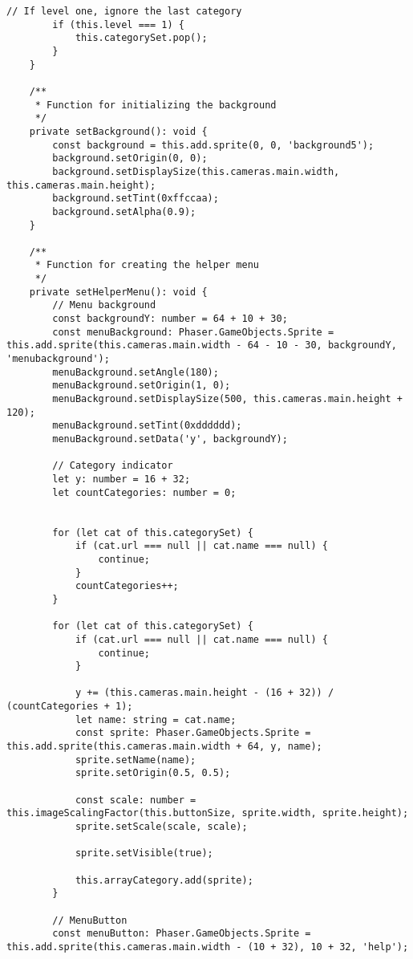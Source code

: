 \begin{lstlisting}[style=TypeScript, caption={gameScene.ts}]
        // If level one, ignore the last category
        if (this.level === 1) {
            this.categorySet.pop();
        }
    }

    /**
     * Function for initializing the background
     */
    private setBackground(): void {
        const background = this.add.sprite(0, 0, 'background5');
        background.setOrigin(0, 0);
        background.setDisplaySize(this.cameras.main.width, this.cameras.main.height);
        background.setTint(0xffccaa);
        background.setAlpha(0.9);
    }

    /**
     * Function for creating the helper menu
     */
    private setHelperMenu(): void {
        // Menu background
        const backgroundY: number = 64 + 10 + 30;
        const menuBackground: Phaser.GameObjects.Sprite = this.add.sprite(this.cameras.main.width - 64 - 10 - 30, backgroundY, 'menubackground');
        menuBackground.setAngle(180);
        menuBackground.setOrigin(1, 0);
        menuBackground.setDisplaySize(500, this.cameras.main.height + 120);
        menuBackground.setTint(0xdddddd);
        menuBackground.setData('y', backgroundY);

        // Category indicator
        let y: number = 16 + 32;
        let countCategories: number = 0;


        for (let cat of this.categorySet) {
            if (cat.url === null || cat.name === null) {
                continue;
            }
            countCategories++;
        }

        for (let cat of this.categorySet) {
            if (cat.url === null || cat.name === null) {
                continue;
            }

            y += (this.cameras.main.height - (16 + 32)) / (countCategories + 1);
            let name: string = cat.name;
            const sprite: Phaser.GameObjects.Sprite = this.add.sprite(this.cameras.main.width + 64, y, name);
            sprite.setName(name);
            sprite.setOrigin(0.5, 0.5);

            const scale: number = this.imageScalingFactor(this.buttonSize, sprite.width, sprite.height);
            sprite.setScale(scale, scale);

            sprite.setVisible(true);

            this.arrayCategory.add(sprite);
        }

        // MenuButton
        const menuButton: Phaser.GameObjects.Sprite = this.add.sprite(this.cameras.main.width - (10 + 32), 10 + 32, 'help');


\end{lstlisting}
